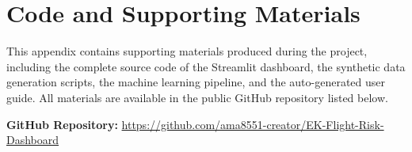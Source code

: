 \chapter{Code and Supporting Materials}
\label{app:code}

This appendix contains supporting materials produced during the project, including the complete source code of the Streamlit dashboard, the synthetic data generation scripts, the machine learning pipeline, and the auto-generated user guide. All materials are available in the public GitHub repository listed below.

\vspace{1em}
\noindent\textbf{GitHub Repository:} \url{https://github.com/ama8551-creator/EK-Flight-Risk-Dashboard}

\nocite{ClausenLarsenLarsenRezanova2010, McKinney2010, MosqueiraRey2023, WatsonWixom2007, Zanzotto2019}
